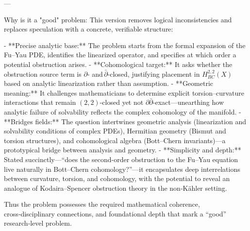 ---

Why is it a "good" problem:  
This version removes logical inconsistencies and replaces speculation with a concrete, verifiable structure:

- **Precise analytic base:** The problem starts from the formal expansion of the Fu–Yau PDE, identifies the linearized operator, and specifies at which order a potential obstruction arises.
- **Cohomological target:** It asks whether the obstruction source term is \(\partial\)- and \(\bar\partial\)-closed, justifying placement in \(H^{2,2}_{BC}(X)\) based on analytic linearization rather than assumption.
- **Geometric meaning:** It challenges mathematicians to determine explicit torsion–curvature interactions that remain \((2,2)\)-closed yet not \(\partial\bar\partial\)-exact—unearthing how analytic failure of solvability reflects the complex cohomology of the manifold.
- **Bridges fields:** The question intertwines geometric analysis (linearization and solvability conditions of complex PDEs), Hermitian geometry (Bismut and torsion structures), and cohomological algebra (Bott–Chern invariants)—a prototypical bridge between analysis and geometry.
- **Simplicity and depth:** Stated succinctly—“does the second-order obstruction to the Fu–Yau equation live naturally in Bott–Chern cohomology?”—it encapsulates deep interrelations between curvature, torsion, and cohomology, with the potential to reveal an analogue of Kodaira–Spencer obstruction theory in the non‑Kähler setting.

Thus the problem possesses the required mathematical coherence, cross‑disciplinary connections, and foundational depth that mark a “good” research‑level problem.